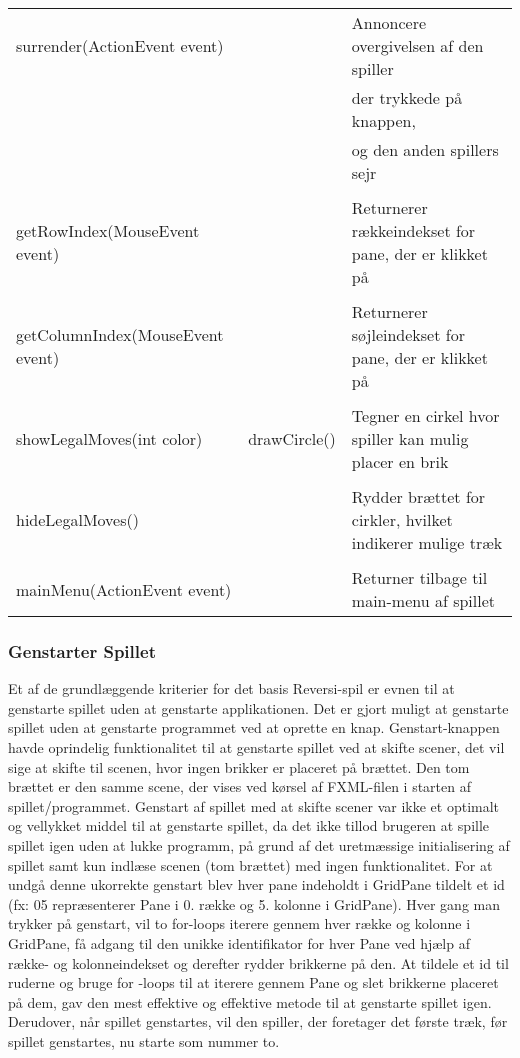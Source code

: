 \begin{table}[H]
\begin{tabular}{lll}
surrender(ActionEvent event) & & Annoncere overgivelsen af den spiller\\
& & der trykkede på knappen,\\
 & & og den anden spillers sejr\\
\\
getRowIndex(MouseEvent event)& & Returnerer rækkeindekset for pane, der er klikket på\\
\\
getColumnIndex(MouseEvent event)& & Returnerer søjleindekset for pane, der er klikket på\\
\\
showLegalMoves(int color) & drawCircle() & Tegner en cirkel hvor spiller kan mulig placer en brik\\
\\
hideLegalMoves() & & Rydder brættet for cirkler, hvilket indikerer mulige træk\\
\\
mainMenu(ActionEvent event) & & Returner tilbage til main-menu af spillet\\

\bottomrule
\end{tabular}
\end{table}

\subsubsection{Genstarter Spillet} \label{gs}

Et af de grundlæggende kriterier for det basis Reversi-spil er evnen til at genstarte spillet uden at genstarte applikationen. Det er gjort muligt at genstarte spillet uden at genstarte programmet ved at oprette en knap. Genstart-knappen havde oprindelig funktionalitet til at genstarte spillet ved at skifte scener, det vil sige at skifte til scenen, hvor ingen brikker er placeret på brættet. Den tom brættet er den samme scene, der vises ved kørsel af FXML-filen i starten af spillet/programmet. Genstart af spillet med at skifte scener var ikke et optimalt og vellykket middel til at genstarte spillet, da det ikke tillod brugeren at spille spillet igen uden at lukke programm, på grund af det uretmæssige initialisering af spillet samt kun indlæse scenen (tom brættet) med ingen funktionalitet. \newline
\newline
For at undgå denne ukorrekte genstart blev hver pane indeholdt i GridPane tildelt et id (fx: 05 repræsenterer Pane i 0. række og 5. kolonne i GridPane). Hver gang man trykker på genstart, vil to for-loops iterere gennem hver række og kolonne i GridPane, få adgang til den unikke identifikator for hver Pane ved hjælp af række- og kolonneindekset og derefter rydder brikkerne  på den. At tildele et id til ruderne og bruge for -loops til at iterere gennem Pane og slet brikkerne placeret på dem, gav den mest effektive og effektive metode til at genstarte spillet igen. Derudover, når spillet genstartes, vil den spiller, der foretager det første træk, før spillet genstartes, nu starte som nummer to.


